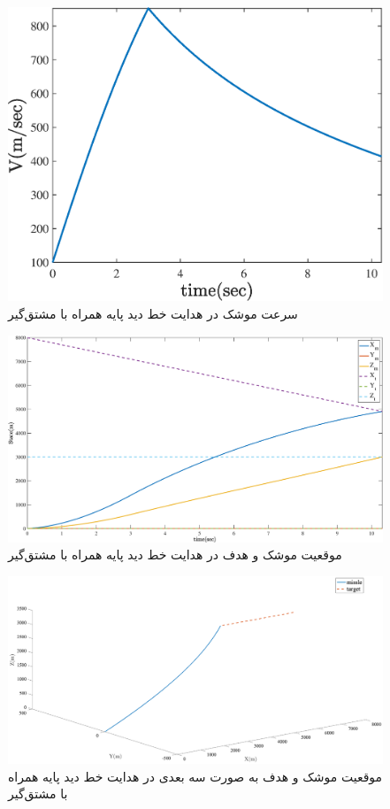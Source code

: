 \begin{figure}[H]
	\centering
	\includegraphics[width=.75\linewidth]{../Figure/d/missle_V}
	\caption{سرعت موشک  در هدایت خط دید پایه همراه با مشتق‌گیر}
\end{figure}

\begin{figure}[H]
	\centering
	\includegraphics[width=\linewidth]{../Figure/d/missle_vs_target_state}
	\caption{موقعیت موشک و هدف  در هدایت خط دید پایه همراه با مشتق‌گیر}
\end{figure}

\begin{figure}[H]
	\centering
	\includegraphics[width=\linewidth]{../Figure/d/3DoF_missle_vs_target_state}
	\caption{موقعیت موشک و هدف به صورت سه بعدی  در هدایت خط دید پایه همراه با مشتق‌گیر}
\end{figure}

